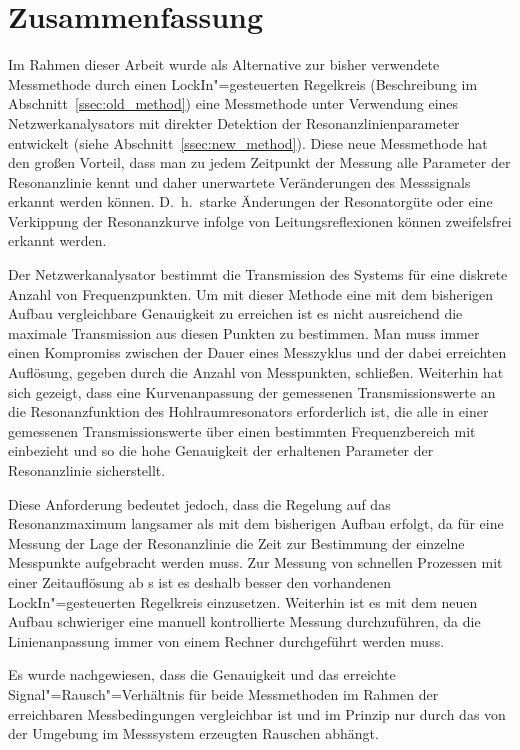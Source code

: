 \chapter*{Zusammenfassung}

Im Rahmen dieser Arbeit wurde als Alternative zur bisher verwendete Messmethode durch einen LockIn"=gesteuerten Regelkreis (Beschreibung im Abschnitt~\ref{ssec:old_method}) eine Messmethode unter Verwendung eines Netzwerkanalysators mit direkter Detektion der Resonanzlinienparameter entwickelt (siehe Abschnitt~\ref{ssec:new_method}). Diese neue Messmethode hat den großen Vorteil, dass man zu jedem Zeitpunkt der Messung alle Parameter der Resonanzlinie kennt und daher unerwartete Veränderungen des Messsignals erkannt werden können. D.~h.~starke Änderungen der Resonatorgüte oder eine Verkippung der Resonanzkurve infolge von Leitungsreflexionen können zweifelsfrei erkannt werden.

Der Netzwerkanalysator bestimmt die Transmission des Systems für eine diskrete Anzahl von Frequenzpunkten. Um mit dieser Methode eine mit dem bisherigen Aufbau vergleichbare Genauigkeit zu erreichen ist es nicht ausreichend die maximale Transmission aus diesen Punkten zu bestimmen. Man muss immer einen Kompromiss zwischen der Dauer eines Messzyklus und der dabei erreichten Auflösung, gegeben durch die Anzahl von Messpunkten, schließen. Weiterhin hat sich gezeigt, dass eine Kurvenanpassung der gemessenen Transmissionswerte an die Resonanzfunktion des Hohlraumresonators erforderlich ist, die alle in einer gemessenen Transmissionswerte über einen bestimmten Frequenzbereich mit einbezieht und so die hohe Genauigkeit der erhaltenen Parameter der Resonanzlinie sicherstellt.

Diese Anforderung bedeutet jedoch, dass die Regelung auf das Resonanzmaximum langsamer als mit dem bisherigen Aufbau erfolgt, da für eine Messung der Lage der Resonanzlinie die Zeit zur Bestimmung der einzelne Messpunkte aufgebracht werden muss. Zur Messung von schnellen Prozessen mit einer Zeitauflösung ab \unit[2]{s} ist es deshalb besser den vorhandenen LockIn"=gesteuerten Regelkreis einzusetzen. Weiterhin ist es mit dem neuen Aufbau schwieriger eine manuell kontrollierte Messung durchzuführen, da die Linienanpassung immer von einem Rechner durchgeführt werden muss.

Es wurde nachgewiesen, dass die Genauigkeit und das erreichte Signal"=Rausch"=Verhältnis für beide Messmethoden im Rahmen der erreichbaren Messbedingungen vergleichbar ist und im Prinzip nur durch das von der Umgebung im Messsystem erzeugten Rauschen abhängt.

